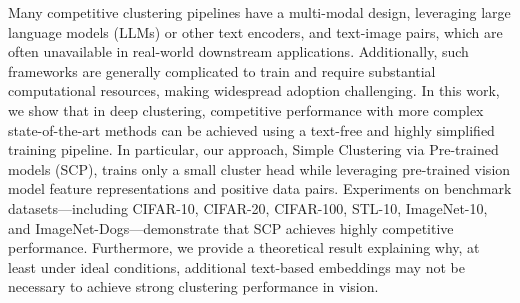 Many competitive clustering pipelines have a multi-modal design, leveraging large language models (LLMs) or other text encoders, and text-image pairs, which are often unavailable in real-world downstream applications. Additionally, such frameworks are generally complicated to train and require substantial computational resources, making widespread adoption challenging. In this work, we show that in deep clustering, competitive performance with more complex state-of-the-art methods can be achieved using a text-free and highly simplified training pipeline. In particular, our approach, Simple Clustering via Pre-trained models (SCP), trains only a small cluster head while leveraging pre-trained vision model feature representations and positive data pairs. Experiments on benchmark datasets—including CIFAR-10, CIFAR-20, CIFAR-100, STL-10, ImageNet-10, and ImageNet-Dogs—demonstrate that SCP achieves highly competitive performance. Furthermore, we provide a theoretical result explaining why, at least under ideal conditions, additional text-based embeddings may not be necessary to achieve strong clustering performance in vision.

